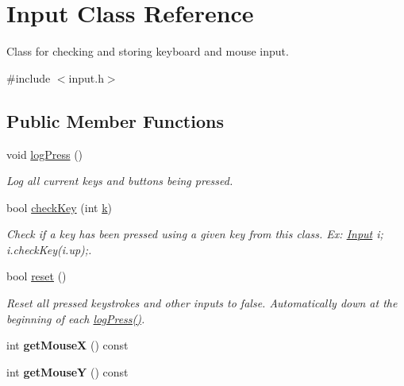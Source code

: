 \hypertarget{classInput}{}\section{Input Class Reference}
\label{classInput}


Class for checking and storing keyboard and mouse input.  




{\ttfamily \#include $<$input.\+h$>$}

\subsection*{Public Member Functions}
\begin{DoxyCompactItemize}
\item 
\mbox{\label{classInput_a7664a52377e4bda7524d288df481954b}} 
void \hyperlink{classInput_a7664a52377e4bda7524d288df481954b}{log\+Press} ()
\begin{DoxyCompactList}\small\item\em Log all current keys and buttons being pressed. \end{DoxyCompactList}\item 
\mbox{\label{classInput_a2f5d21366e04e3ce200fe73c6c748dd8}} 
bool \hyperlink{classInput_a2f5d21366e04e3ce200fe73c6c748dd8}{check\+Key} (int \hyperlink{classInput_aa069678fdc7c45c405c044ed8e45a379}{k})
\begin{DoxyCompactList}\small\item\em Check if a key has been pressed using a given key from this class. Ex\+: \hyperlink{classInput}{Input} i; i.\+check\+Key(i.\+up);. \end{DoxyCompactList}\item 
\mbox{\label{classInput_ac4fc1b961553d6ca8a603ee0a53f311c}} 
bool \hyperlink{classInput_ac4fc1b961553d6ca8a603ee0a53f311c}{reset} ()
\begin{DoxyCompactList}\small\item\em Reset all pressed keystrokes and other inputs to false. Automatically down at the beginning of each \hyperlink{classInput_a7664a52377e4bda7524d288df481954b}{log\+Press()}. \end{DoxyCompactList}\item 
\mbox{\label{classInput_a2a918bf7c8646cfaf5b110de7ed11a80}} 
int {\bfseries get\+MouseX} () const
\item 
\mbox{\label{classInput_a34bf11cdc19a85b4c50dcf2d8637b33f}} 
int {\bfseries get\+MouseY} () const
\end{DoxyCompactItemize}
